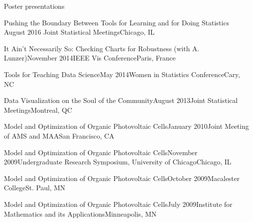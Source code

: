 \documentclass{resume} %
\begin{document}
\begin{rSection}{Poster presentations}

\begin{sSubsection}{Pushing the Boundary Between Tools for Learning and for Doing Statistics}{ }{August 2016 }{Joint Statistical Meetings}{Chicago, IL}
\end{sSubsection}

\begin{sSubsection}{It Ain't Necessarily So: Checking Charts for Robustness}{ (with A. Lunzer)}{November 2014}{IEEE Vis Conference}{Paris, France}
\end{sSubsection}

\begin{sSubsection}{Tools for Teaching Data Science}{}{May 2014}{Women in Statistics Conference}{Cary, NC}
\end{sSubsection}

\begin{sSubsection}{Data Visualization on the Soul of the Community}{}{August 2013}{Joint Statistical Meetings}{Montreal, QC}
\end{sSubsection}

\begin{sSubsection}{Model and Optimization of Organic Photovoltaic Cells}{}{January 2010}{Joint Meeting of AMS and MAA}{San Francisco, CA}
\end{sSubsection}

\begin{sSubsection}{Model and Optimization of Organic Photovoltaic Cells}{}{November 2009}{Undergraduate Research Symposium, University of Chicago}{Chicago, IL}
\end{sSubsection}

\begin{sSubsection}{Model and Optimization of Organic Photovoltaic Cells}{}{October 2009}{Macalester College}{St. Paul, MN}
\end{sSubsection}

\begin{sSubsection}{Model and Optimization of Organic Photovoltaic Cells}{}{July 2009}{Institute for Mathematics and its Applications}{Minneapolis, MN}
\end{sSubsection}
\end{rSection}

\end{document}
